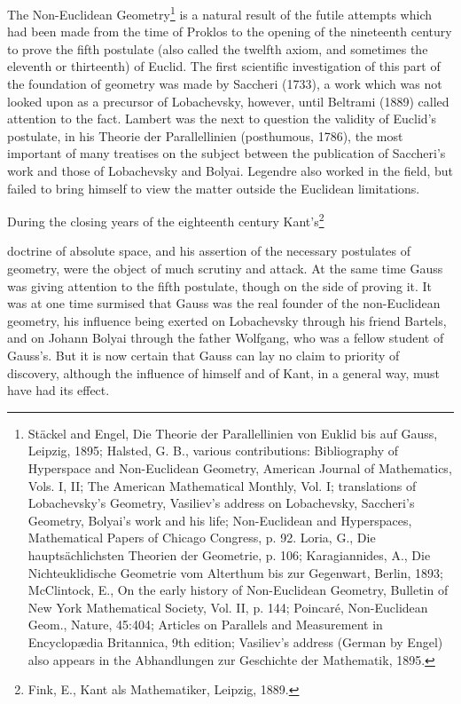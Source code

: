 \documentclass[oneside]{book}
\begin{document}
{The Non-Euclidean Geometry\footnote{St\"ackel and Engel, Die
Theorie der Parallellinien von Euklid bis auf Gauss, Leipzig, 1895;
Halsted, G. B., various contributions: Bibliography of Hyperspace
and Non-Euclidean Geometry, American Journal of Mathematics,
Vols. I, II; The American Mathematical Monthly, Vol. I; translations
of Lobachevsky's Geometry, Vasiliev's address on Lobachevsky,
Saccheri's Geometry, Bolyai's work and his life; Non-Euclidean and
Hyperspaces, Mathematical Papers of Chicago Congress, p. 92. Loria,
G., Die haupts\"achlichsten Theorien der Geometrie, p. 106;
Karagiannides, A., Die Nichteuklidische Geometrie vom Alterthum bis
zur Gegenwart, Berlin, 1893; McClintock, E., On the early history of
Non-Euclidean Geometry, Bulletin of New York Mathematical Society,
Vol. II, p. 144; Poincar\'e, Non-Euclidean Geom., Nature, 45:404;
Articles on Parallels and Measurement in Encyclop\ae{}dia Britannica,
9th edition; Vasiliev's address (German by Engel) also appears in
the Abhandlungen zur Geschichte der Mathematik, 1895.} is a natural
result of the futile attempts which had been made from the time of
Proklos to the opening of the nineteenth century to prove the fifth
postulate (also called the twelfth axiom, and sometimes the eleventh
or thirteenth) of Euclid. The first scientific investigation of
this part of the foundation of geometry was made by Saccheri (1733),
a work which was not looked upon as a precursor of Lobachevsky,
however, until Beltrami (1889) called attention to the fact. Lambert
was the next to question the validity of Euclid's postulate, in his
Theorie der Parallellinien (posthumous, 1786), the most important of
many treatises on the subject between the publication of Saccheri's
work and those of Lobachevsky and Bolyai. Legendre also worked in
the field, but failed to bring himself to view the matter outside
the Euclidean limitations.

During the closing years of the eighteenth century
Kant's\footnote{Fink, E., Kant als Mathematiker, Leipzig, 1889.}

doctrine of absolute space, and his assertion of the necessary
postulates of geometry, were the object of much scrutiny and
attack. At the same time Gauss was giving attention to the fifth
postulate, though on the side of proving it. It was at one time
surmised that Gauss was the real founder of the non-Euclidean
geometry, his influence being exerted on Lobachevsky through his
friend Bartels, and on Johann Bolyai through the father Wolfgang,
who was a fellow student of Gauss's. But it is now certain that
Gauss can lay no claim to priority of discovery, although the
influence of himself and of Kant, in a general way, must have had
its effect.

}
\end{document}

